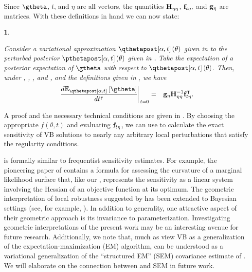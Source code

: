 \documentclass{article}\usepackage[]{graphicx}\usepackage[]{color}
\theoremstyle{plain}
\newtheorem{thm}{\protect\theoremname}[section]
\theoremstyle{definition}
\theoremstyle{plain}
\theoremstyle{plain}
\theoremstyle{plain}
\theoremstyle{plain}
\providecommand{\theoremname}{Theorem}
\begin{document}
Since $\gtheta$, $t$, and $\eta$ are all vectors, the quantities
$\mathbf{H}_{\eta\eta}$, $\mathbf{f}_{t\eta}$, and $\mathbf{g}_{\eta}$ are matrices. With these definitions
in hand we can now state:
\begin{thm}
\label{thm:lrvb_formula}

Consider a variational approximation $\qtthetapost\left(\theta\right)$
given in  to the perturbed
posterior $\ptthetapost\left(\theta\right)$ given in .
Take the expectation of a posterior expectation of $\gtheta$ with
respect to $\qtthetapost\left(\theta\right)$. Then, under ,
, , and ,
and the definitions given in , we have
\begin{eqnarray}
\left.\frac{d\mbe_{\qtthetapost}\left[\gtheta\right]}{dt^{\trans}}\right|_{t=0} & = & \eggrad\klhess^{-1}\efhess^{\trans}.\label{eq:lrvb_formula}
\end{eqnarray}
%
\end{thm}

A proof and the necessary technical conditions are given in .
By choosing the appropriate $f\left(\theta,t\right)$ and evaluating
$\mathbf{f}_{t\eta}$, we can use  to calculate
the exact sensitivity of VB solutions to nearly any arbitrary local
perturbations that satisfy the regularity conditions.

 is formally similar to frequentist sensitivity
estimates. For example, the pioneering paper of \citet{cook:1986:assessment}
contains a formula for assessing the curvature of a marginal likelihood
surface \citep[Equation 15]{cook:1986:assessment} that, like our
, represents the sensitivity as a linear
system involving the Hessian of an objective function at its optimum.
The geometric interpretation of local robustness suggested by \citet{cook:1986:assessment}
has been extended to Bayesian settings (see, for example, \citet{zhu:2007:perturbation,zhu:2011:bayesian}).
In addition to generality, one attractive aspect of their geometric
approach is its invariance to parameterization. Investigating geometric
interpretations of the present work may be an interesting avenue for
future research. Additionally, we note that, much as \citet{neal:1998:variationalEM}
view VB as a generalization of the expectation-maximization (EM) algorithm,
 can be understood as a variational generalization
of the ``structured EM'' (SEM) covariance estimate of \citet{meng:1991:using}.
We will elaborate on the connection between 
and SEM in future work.
\end{document}
